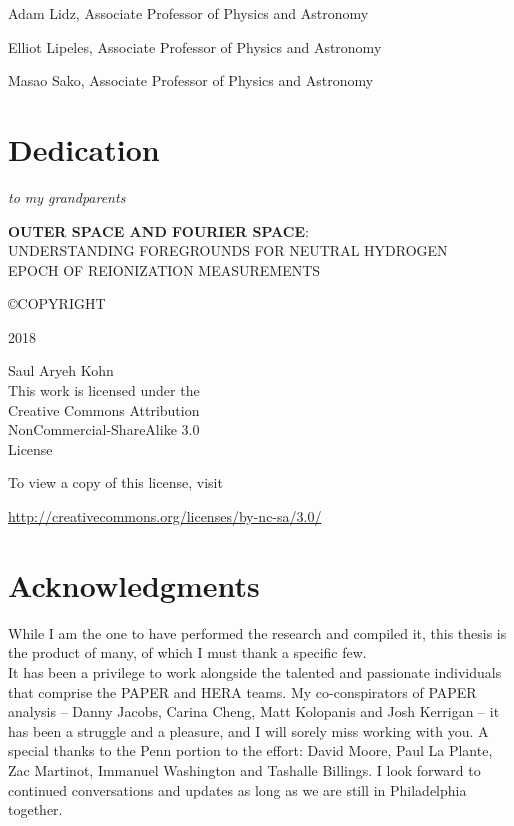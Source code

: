 \documentclass[12pt,twoside,openany]{book}
\makeatletter
\newcommand{\doublespaced}{\renewcommand{\baselinestretch}{2}\normalfont}
\newcommand{\halfspaced}{\renewcommand{\baselinestretch}{1.5}\normalfont}
\newcommand{\unchapter}[1]{%
  \begingroup
  \let\@makechapterhead\@gobble %
  \chapter{#1}
  \endgroup
}
\newcommand{\tita}{{\bf OUTER SPACE AND FOURIER SPACE}:\\UNDERSTANDING FOREGROUNDS FOR NEUTRAL HYDROGEN\\EPOCH OF REIONIZATION MEASUREMENTS}
\makeatother
\begin{document}
\noindent Adam Lidz, Associate Professor of Physics and Astronomy

\noindent Elliot Lipeles, Associate Professor of Physics and Astronomy

\noindent Masao Sako, Associate Professor of Physics and Astronomy

\newpage

\pagestyle{plain}
\unchapter{Dedication}
\doublespaced
\vspace*{2in}
\begin{center}
{\large\emph{to my grandparents}}
\end{center}

\newpage


\thispagestyle{empty} %

\vspace*{\fill}

\begin{flushleft}
{\tita }

\copyright \space COPYRIGHT
 
2018

Saul Aryeh Kohn\\[24 pt] %

This work is licensed under the \\
Creative Commons Attribution \\
NonCommercial-ShareAlike 3.0 \\
License

To view a copy of this license, visit

\url{http://creativecommons.org/licenses/by-nc-sa/3.0/}
\end{flushleft}



\chapter{Acknowledgments}

\noindent
While I am the one to have performed the research and compiled it, this thesis is the product of many, of which I must thank a specific few. \\

\noindent
It has been a privilege to work alongside the talented and passionate individuals that comprise the PAPER and HERA teams. My co-conspirators of PAPER analysis -- Danny Jacobs, Carina Cheng, Matt Kolopanis and Josh Kerrigan -- it has been a struggle and a pleasure, and I will sorely miss working with you. A special thanks to the Penn portion to the effort: David Moore, Paul La Plante, Zac Martinot, Immanuel Washington and Tashalle Billings. I look forward to continued conversations and updates as long as we are still in Philadelphia together.\\
\end{document}
